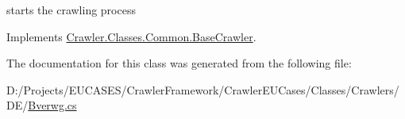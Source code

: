 starts the crawling process 



Implements \hyperlink{class_crawler_1_1_classes_1_1_common_1_1_base_crawler_a14b2a286ce7fb2899bd915dd345bf6b7}{Crawler.\-Classes.\-Common.\-Base\-Crawler}.



The documentation for this class was generated from the following file\-:\begin{DoxyCompactItemize}
\item 
D\-:/\-Projects/\-E\-U\-C\-A\-S\-E\-S/\-Crawler\-Framework/\-Crawler\-E\-U\-Cases/\-Classes/\-Crawlers/\-D\-E/\hyperlink{_bverwg_8cs}{Bverwg.\-cs}\end{DoxyCompactItemize}
